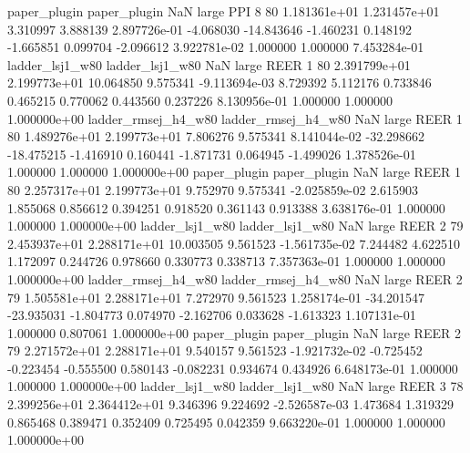        paper_plugin        paper_plugin                   NaN      large      PPI                 8 80 1.181361e+01   1.231457e+01      3.310997       3.888139  2.897726e-01     -4.068030    -14.843646    -1.460231       0.148192 -1.665851   0.099704    -2.096612   3.922781e-02            1.000000        1.000000        7.453284e-01
    ladder_lsj1_w80     ladder_lsj1_w80                   NaN      large     REER                 1 80 2.391799e+01   2.199773e+01     10.064850       9.575341 -9.113694e-03      8.729392      5.112176     0.733846       0.465215  0.770062   0.443560     0.237226   8.130956e-01            1.000000        1.000000        1.000000e+00
ladder_rmsej_h4_w80 ladder_rmsej_h4_w80                   NaN      large     REER                 1 80 1.489276e+01   2.199773e+01      7.806276       9.575341  8.141044e-02    -32.298662    -18.475215    -1.416910       0.160441 -1.871731   0.064945    -1.499026   1.378526e-01            1.000000        1.000000        1.000000e+00
       paper_plugin        paper_plugin                   NaN      large     REER                 1 80 2.257317e+01   2.199773e+01      9.752970       9.575341 -2.025859e-02      2.615903      1.855068     0.856612       0.394251  0.918520   0.361143     0.913388   3.638176e-01            1.000000        1.000000        1.000000e+00
    ladder_lsj1_w80     ladder_lsj1_w80                   NaN      large     REER                 2 79 2.453937e+01   2.288171e+01     10.003505       9.561523 -1.561735e-02      7.244482      4.622510     1.172097       0.244726  0.978660   0.330773     0.338713   7.357363e-01            1.000000        1.000000        1.000000e+00
ladder_rmsej_h4_w80 ladder_rmsej_h4_w80                   NaN      large     REER                 2 79 1.505581e+01   2.288171e+01      7.272970       9.561523  1.258174e-01    -34.201547    -23.935031    -1.804773       0.074970 -2.162706   0.033628    -1.613323   1.107131e-01            1.000000        0.807061        1.000000e+00
       paper_plugin        paper_plugin                   NaN      large     REER                 2 79 2.271572e+01   2.288171e+01      9.540157       9.561523 -1.921732e-02     -0.725452     -0.223454    -0.555500       0.580143 -0.082231   0.934674     0.434926   6.648173e-01            1.000000        1.000000        1.000000e+00
    ladder_lsj1_w80     ladder_lsj1_w80                   NaN      large     REER                 3 78 2.399256e+01   2.364412e+01      9.346396       9.224692 -2.526587e-03      1.473684      1.319329     0.865468       0.389471  0.352409   0.725495     0.042359   9.663220e-01            1.000000        1.000000        1.000000e+00
